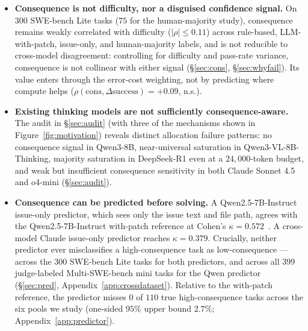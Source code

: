 \documentclass{article}
\begin{document}
\begin{itemize}
\item[(1)] \textbf{Consequence is not difficulty, nor a disguised
confidence signal.} On $300$ SWE-bench Lite tasks ($75$ for the
human-majority study), consequence
remains weakly correlated with difficulty ($|\rho| \le 0.11$)
across rule-based, LLM-with-patch, issue-only, and human-majority
labels, and is not reducible to cross-model disagreement: controlling
for difficulty and pass-rate variance, consequence is not collinear
with either signal (\S\ref{sec:cons}, \S\ref{sec:whyfail}). Its
value enters through the error-cost weighting, not by predicting
where compute helps ($\rho(\mathrm{cons}, \Delta\mathrm{success})
= +0.09$, n.s.).

\item[(2)] \textbf{Existing thinking models are not sufficiently
consequence-aware.} The audit in \S\ref{sec:audit} (with three of the
mechanisms shown in Figure~\ref{fig:motivation}) reveals
distinct allocation failure patterns: no consequence signal in
Qwen3-8B, near-universal saturation in Qwen3-VL-8B-Thinking, majority
saturation in DeepSeek-R1 even at a $24{,}000$-token budget, and weak
but insufficient consequence sensitivity in both Claude Sonnet 4.5 and
o4-mini (\S\ref{sec:audit}).

\item[(3)] \textbf{Consequence can be predicted before solving.} A
Qwen2.5-7B-Instruct~\citep{qwen2025qwen25} issue-only predictor, which sees only the issue text and file
path, agrees with the Qwen2.5-7B-Instruct with-patch reference at Cohen's
$\kappa = 0.572$~\citep{cohen1960kappa}. A cross-model Claude issue-only predictor reaches
$\kappa = 0.379$. Crucially, neither predictor ever misclassifies a
high-consequence task as low-consequence --- across the $300$
SWE-bench Lite tasks for both predictors, and across all $399$
judge-labeled Multi-SWE-bench mini tasks for the Qwen predictor
(\S\ref{sec:pred}, Appendix~\ref{app:crossdataset}). Relative to
the with-patch reference, the predictor misses $0$ of $110$ true
high-consequence tasks across the six pools we study (one-sided
$95\%$ upper bound $2.7\%$; Appendix~\ref{app:predictor}).


\end{itemize}
\end{document}

